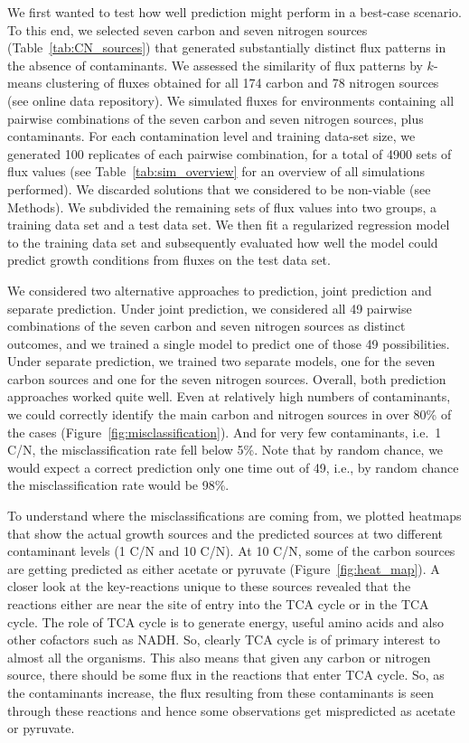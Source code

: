\documentclass[12pt]{article}
\begin{document}
We first wanted to test how well prediction might perform in a best-case scenario. To this end, we selected seven carbon and seven nitrogen sources (Table~\ref{tab:CN_sources}) that generated substantially distinct flux patterns in the absence of contaminants. We assessed the similarity of flux patterns by $k$-means clustering of fluxes obtained for all 174 carbon and 78 nitrogen sources (see online data repository). We simulated fluxes for environments containing all pairwise combinations of the seven carbon and seven nitrogen sources, plus contaminants. For each contamination level and training data-set size, we generated 100 replicates of each pairwise combination, for a total of 4900 sets of flux values (see Table~\ref{tab:sim_overview} for an overview of all simulations performed). We discarded solutions that we considered to be non-viable (see Methods). We subdivided the remaining sets of flux values into two groups, a training data set and a test data set. We then fit a regularized regression model to the training data set and subsequently evaluated how well the model could predict growth conditions from fluxes on the test data set.

We considered two alternative approaches to prediction, joint prediction and separate prediction. Under joint prediction, we considered all 49 pairwise combinations of the seven carbon and seven nitrogen sources as distinct outcomes, and we trained a single model to predict one of those 49 possibilities. Under separate prediction, we trained two separate models, one for the seven carbon sources and one for the seven nitrogen sources. Overall, both prediction approaches worked quite well.  Even at relatively high numbers of contaminants, we could correctly identify the main carbon and nitrogen sources in over 80\% of the cases (Figure~\ref{fig:misclassification}).  And for very few contaminants, i.e.\ 1 C/N, the misclassification rate fell below 5\%. Note that by random chance, we would expect a correct prediction only one time out of 49, i.e., by random chance the misclassification rate would be 98\%.

To understand where the misclassifications are coming from, we plotted heatmaps that show the actual growth sources and the predicted sources at two different contaminant levels (1 C/N and 10 C/N). At 10 C/N, some of the carbon sources are getting predicted as either acetate or pyruvate (Figure~\ref{fig:heat_map}). A closer look at the key-reactions unique to these sources revealed that the reactions either are near the site of entry into the TCA cycle or in the TCA cycle. The role of TCA cycle is to generate energy, useful amino acids and also other cofactors such as NADH. So, clearly TCA cycle is of primary interest to almost all the organisms. This also means that given any carbon or nitrogen source, there should be some flux in the reactions that enter TCA cycle. So, as the contaminants increase, the flux resulting from these contaminants is seen through these reactions and hence some observations get mispredicted as acetate or pyruvate. 
\end{document}
